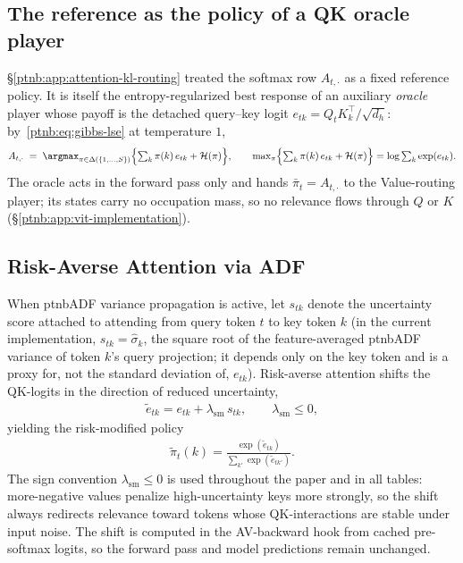 \subsection{The reference as the policy of a QK oracle player}\label{ptnb:app:attention-oracle}

\S\ref{ptnb:app:attention-kl-routing} treated the softmax row $A_{t,\cdot}$ as a fixed reference policy.
It is itself the entropy-regularized best response of an auxiliary \emph{oracle} player whose
payoff is the detached query--key logit $e_{tk} = Q_t K_k^\top/\sqrt{d_h}$: by~\eqref{ptnb:eq:gibbs-lse}
at temperature $1$,
\begin{align}\label{ptnb:eq:attn-qk-oracle}
    A_{t,\cdot} \;=\; \argmax_{\pi \in \Delta(\{1,\dots,S\})} \Bigl\{ \textstyle\sum_{k} \pi(k)\,
    e_{tk} + \mathcal{H}(\pi) \Bigr\},
    \qquad
    \max_{\pi} \Bigl\{ \textstyle\sum_{k} \pi(k)\, e_{tk} + \mathcal{H}(\pi) \Bigr\} = \log
    \textstyle\sum_{k} \exp(e_{tk}).
\end{align}
The oracle acts in the forward pass only and hands $\bar\pi_t = A_{t,\cdot}$ to the Value-routing
player; its states carry no occupation mass, so no relevance flows through $Q$ or $K$
(\S\ref{ptnb:app:vit-implementation}).

\subsection{Risk-Averse Attention via ADF}\label{ptnb:app:risk-attn}

When \ac{ptnbADF} variance propagation is active, let $s_{tk}$ denote the uncertainty score attached to
attending from query token $t$ to key token $k$ (in the current implementation, $s_{tk} =
    \hat{\sigma}_k$, the square root of the feature-averaged \ac{ptnbADF} variance of token $k$'s query
projection; it depends only on the key token and is a proxy for, not the standard deviation of,
$e_{tk}$). Risk-averse attention shifts the QK-logits in the direction of reduced uncertainty,
\begin{align}\label{ptnb:eq:risk-attn-policy}
    \tilde e_{tk} = e_{tk} + \lambda_{\mathrm{sm}}\, s_{tk},
    \qquad \lambda_{\mathrm{sm}} \le 0,
\end{align}
yielding the risk-modified policy
\begin{align}\label{ptnb:eq:risk-attn-policy-softmax}
    \tilde{\pi}_t(k) = \frac{\exp(\tilde e_{tk})}{\sum_{k'} \exp(\tilde e_{tk'})}.
\end{align}
The sign convention $\lambda_{\mathrm{sm}} \le 0$ is used throughout the paper and in all tables:
more-negative values penalize high-uncertainty keys more strongly, so the shift always redirects
relevance toward tokens whose QK-interactions are stable under input noise. The shift is computed
in the AV-backward hook from cached pre-softmax logits, so the forward pass and model predictions
remain unchanged.

